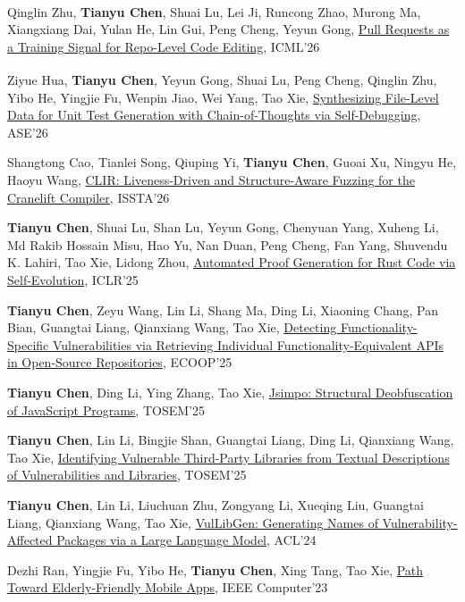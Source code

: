 \documentclass[letterpaper]{article}
\renewenvironment{itemize}{
  \begin{list}{}{
    \setlength{\leftmargin}{1.5em}
  }
}{
  \end{list}
}
\begin{document}
\begin{itemize}
    \item Qinglin Zhu, \textbf{Tianyu Chen}\textsuperscript{\textdagger}, Shuai Lu, Lei Ji, Runcong Zhao, Murong Ma, Xiangxiang Dai, Yulan He, Lin Gui, Peng Cheng, Yeyun Gong, \href{https://arxiv.org/abs/2602.07457}{Pull Requests as a Training Signal for Repo-Level Code Editing}, ICML'26
    \item Ziyue Hua, \textbf{Tianyu Chen}\textsuperscript{\textdagger}, Yeyun Gong, Shuai Lu, Peng Cheng, Qinglin Zhu, Yibo He, Yingjie Fu, Wenpin Jiao, Wei Yang, Tao Xie, \href{https://arxiv.org/abs/2602.03181}{Synthesizing File-Level Data for Unit Test Generation with Chain-of-Thoughts via Self-Debugging}, ASE'26
    \item Shangtong Cao, Tianlei Song, Qiuping Yi, \textbf{Tianyu Chen}, Guoai Xu, Ningyu He, Haoyu Wang, \href{https://arxiv.org/abs/2606.26977}{CLIR: Liveness-Driven and Structure-Aware Fuzzing for the Cranelift Compiler}, ISSTA'26
    \item \textbf{Tianyu Chen}, Shuai Lu, Shan Lu, Yeyun Gong, Chenyuan Yang, Xuheng Li, Md Rakib Hossain Misu, Hao Yu, Nan Duan, Peng Cheng, Fan Yang, Shuvendu K. Lahiri, Tao Xie, Lidong Zhou, \href{https://arxiv.org/abs/2410.15756}{Automated Proof Generation for Rust Code via Self-Evolution}, ICLR'25
    \item \textbf{Tianyu Chen}, Zeyu Wang, Lin Li, Shang Ma, Ding Li, Xiaoning Chang, Pan Bian, Guangtai Liang, Qianxiang Wang, Tao Xie, \href{https://doi.org/10.4230/LIPIcs.ECOOP.2025.6}{Detecting Functionality-Specific Vulnerabilities via Retrieving Individual Functionality-Equivalent APIs in Open-Source Repositories}, ECOOP'25
    \item \textbf{Tianyu Chen}, Ding Li, Ying Zhang, Tao Xie, \href{https://dl.acm.org/doi/10.1145/3714460}{Jsimpo: Structural Deobfuscation of JavaScript Programs}, TOSEM'25
    \item \textbf{Tianyu Chen}, Lin Li, Bingjie Shan, Guangtai Liang, Ding Li, Qianxiang Wang, Tao Xie, \href{https://doi.org/10.1145/3717060}{Identifying Vulnerable Third-Party Libraries from Textual Descriptions of Vulnerabilities and Libraries}, TOSEM'25
    \item \textbf{Tianyu Chen}, Lin Li, Liuchuan Zhu, Zongyang Li, Xueqing Liu, Guangtai Liang, Qianxiang Wang, Tao Xie, \href{https://arxiv.org/abs/2308.04662}{VulLibGen: Generating Names of Vulnerability-Affected Packages via a Large Language Model}, ACL'24
    \item Dezhi Ran, Yingjie Fu, Yibo He, \textbf{Tianyu Chen}, Xing Tang, Tao Xie, \href{https://ieeexplore.ieee.org/abstract/document/10547079}{Path Toward Elderly-Friendly Mobile Apps}, IEEE Computer'23
\end{itemize}
\end{document}

